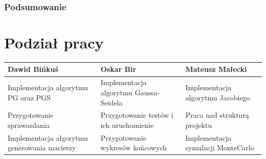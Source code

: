 \documentclass[10pt]{article}
\begin{document}
\subsubsection{Podsumowanie}
\section{Podział pracy}
\centering
	\begin{tabular}{| p{4.5cm} | p{4.5cm} | p{4.5cm} |}
		\hline
		\textbf{Dawid Bińkuś} & \textbf{Oskar Bir} & \textbf{Mateusz Małecki} \\ \hline
		Implementacja algorytmu PG oraz PGS & Implementacja algorytmu Gaussa-Seidela & Implementacja algorytmu Jacobiego \\ \hline
		Przygotowanie sprawozdania & Przygotowanie testów i ich uruchomienie & Praca nad strukturą projektu \\ \hline
		Implementacja algorytmu generowania macierzy & Przygotowanie wykresów końcowych &Implementacja symulacji MonteCarlo\\ \hline
		
		
		
	\end{tabular}
\end{document}
